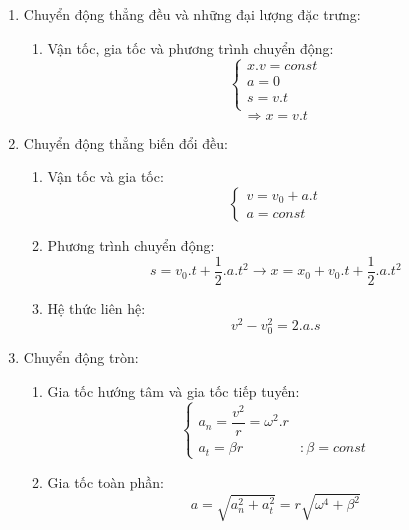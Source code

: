 \documentclass[12pt,a4paper]{report}
\begin{document}
{\begin{center}
    
    \begin{enumerate}
        \item Chuyển động thẳng đều và những đại lượng đặc trưng:
            \begin{enumerate}
                \item Vận tốc, gia tốc và phương trình chuyển động:
                    \[\left\{
                    \begin{array}{lr}
                    x.v = const \\
                    a = 0  \\
                    s = v.t \\
                    \end{array}
                    \right.
                    \]
                    \[\Rightarrow x = v.t\]
            \end{enumerate}
        \item Chuyển động thẳng biến đổi đều:
            \begin{enumerate}
                \item Vận tốc và gia tốc: \[
                    \left\{
                    \begin{array}{lr}
                    v = v_{0} + a.t \\
                    a = const
                    \end{array}
                    \right.
                \]
                \item Phương trình chuyển động: \[
                    s = v_{0}.t + \dfrac{1}{2}.a.t^{2}  \rightarrow  x = x_{0} + v_{0}.t + \dfrac{1}{2}.a.t^{2}
                \]
                \item Hệ thức liên hệ: \[
                    v^{2} - v_{0}^{2} = 2.a.s  
                \]
            \end{enumerate}
        \item  Chuyển động tròn:
            \begin{enumerate}
                \item Gia tốc hướng tâm và gia tốc tiếp tuyến:\[
                    \left\{
                    \begin{array}{lr}
                        a_{n} = \dfrac{v^{2}}{r} = \omega ^{2}.r \\
                        a_{t} = \beta r & :  \beta = const
                    \end{array}
                    \right.  
                \]
                \item Gia tốc toàn phần: \[a = \sqrt{a_{n}^{2} + a_{t}^{2}} = r\sqrt{\omega ^{4} + \beta ^{2}}\]

\end{enumerate}
\end{enumerate}
\end{center}}
\end{document}
